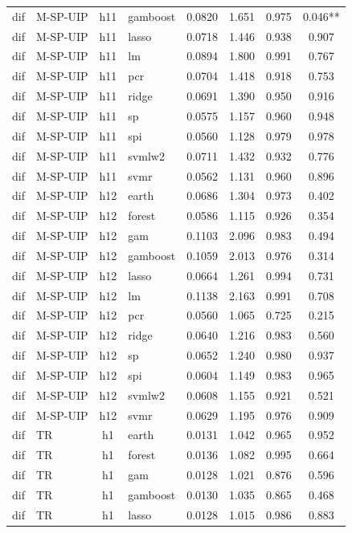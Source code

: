 \begin{ThreePartTable}
\begin{longtable}[t]{llclcccc}
dif & M-SP-UIP & h11 & gamboost & 0.0820 & 1.651 & 0.975 & 0.046**\\
dif & M-SP-UIP & h11 & lasso & 0.0718 & 1.446 & 0.938 & 0.907\\
dif & M-SP-UIP & h11 & lm & 0.0894 & 1.800 & 0.991 & 0.767\\
dif & M-SP-UIP & h11 & pcr & 0.0704 & 1.418 & 0.918 & 0.753\\
dif & M-SP-UIP & h11 & ridge & 0.0691 & 1.390 & 0.950 & 0.916\\
dif & M-SP-UIP & h11 & sp & 0.0575 & 1.157 & 0.960 & 0.948\\
dif & M-SP-UIP & h11 & spi & 0.0560 & 1.128 & 0.979 & 0.978\\
dif & M-SP-UIP & h11 & svmlw2 & 0.0711 & 1.432 & 0.932 & 0.776\\
dif & M-SP-UIP & h11 & svmr & 0.0562 & 1.131 & 0.960 & 0.896\\
\addlinespace
dif & M-SP-UIP & h12 & earth & 0.0686 & 1.304 & 0.973 & 0.402\\
dif & M-SP-UIP & h12 & forest & 0.0586 & 1.115 & 0.926 & 0.354\\
dif & M-SP-UIP & h12 & gam & 0.1103 & 2.096 & 0.983 & 0.494\\
dif & M-SP-UIP & h12 & gamboost & 0.1059 & 2.013 & 0.976 & 0.314\\
dif & M-SP-UIP & h12 & lasso & 0.0664 & 1.261 & 0.994 & 0.731\\
dif & M-SP-UIP & h12 & lm & 0.1138 & 2.163 & 0.991 & 0.708\\
dif & M-SP-UIP & h12 & pcr & 0.0560 & 1.065 & 0.725 & 0.215\\
dif & M-SP-UIP & h12 & ridge & 0.0640 & 1.216 & 0.983 & 0.560\\
dif & M-SP-UIP & h12 & sp & 0.0652 & 1.240 & 0.980 & 0.937\\
dif & M-SP-UIP & h12 & spi & 0.0604 & 1.149 & 0.983 & 0.965\\
dif & M-SP-UIP & h12 & svmlw2 & 0.0608 & 1.155 & 0.921 & 0.521\\
dif & M-SP-UIP & h12 & svmr & 0.0629 & 1.195 & 0.976 & 0.909\\
\addlinespace
dif & TR & h1 & earth & 0.0131 & 1.042 & 0.965 & 0.952\\
dif & TR & h1 & forest & 0.0136 & 1.082 & 0.995 & 0.664\\
dif & TR & h1 & gam & 0.0128 & 1.021 & 0.876 & 0.596\\
dif & TR & h1 & gamboost & 0.0130 & 1.035 & 0.865 & 0.468\\
dif & TR & h1 & lasso & 0.0128 & 1.015 & 0.986 & 0.883\\

\end{longtable}
\end{ThreePartTable}

